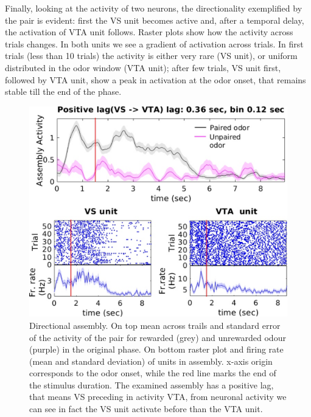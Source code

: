 Finally, looking at the activity of two neurons, the directionality exemplified by the pair is evident: first the VS unit becomes active and, after a temporal delay, the activation of VTA unit follows. Raster plots show how the activity across trials changes. In both units we see a gradient of activation across trials. In first trials (less than 10 trials) the activity is either very rare (VS unit), or uniform distributed in the odor window (VTA unit); after few trials, VS unit first, followed by VTA unit, show a peak in activation at the odor onset, that remains stable till the end of the phase.\\ 
\begin{figure}
    \centering
    \includegraphics[scale=0.6]{figures/DirectionalAsEx1.pdf}
    \caption{Directional assembly. On top mean across trails and standard error of the activity of the pair for rewarded (grey) and unrewarded odour (purple) in the original phase. On bottom raster plot and firing rate (mean and standard deviation) of units in assembly. x-axis origin corresponds to the odor onset, while the red line marks the end of the stimulus duration. The examined assembly has a positive lag, that means VS preceding in activity VTA, from neuronal activity we can see in fact the VS unit activate before than the VTA unit.}
    \label{fig:directional_assembly}
\end{figure}
